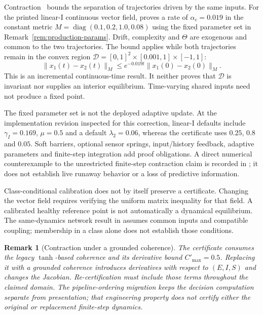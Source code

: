 \documentclass[11pt,twocolumn]{article}
\newtheorem{remark}[theorem]{Remark}
\begin{document}
Contraction~\cite{lohmiller1998contraction} bounds the separation
of trajectories driven by the same inputs. For the printed
linear-I continuous vector field, 
proves a rate of $\alpha_c=0.019$ in the constant metric
$M=\operatorname{diag}(0.1,0.2,1.0,0.08)$ using the fixed
parameter set in Remark~\ref{rem:production-params}. Drift,
complexity and $\Theta$ are exogenous and common to the two
trajectories. The bound applies while both trajectories remain
in the convex region
$\mathcal D=[0,1]^2\times[0.001,1]\times[-1,1]$:
\begin{equation}
 \|x_1(t)-x_2(t)\|_M
 \le e^{-0.019t}\|x_1(0)-x_2(0)\|_M.
 \label{eq:continuous-distance-bound}
\end{equation}
This is an incremental continuous-time result. It neither proves
that $\mathcal D$ is invariant nor supplies an interior equilibrium.
Time-varying shared inputs need not produce a fixed point.

The fixed parameter set is not the deployed adaptive update.
At the implementation revision inspected for this correction,
linear-I defaults include $\gamma_I=0.169$, $\mu=0.5$ and a default
$\lambda_2=0.06$, whereas the certificate uses $0.25$, $0.8$
and $0.05$. Soft barriers, optional sensor springs, input/history
feedback, adaptive parameters and finite-step integration add
proof obligations. A direct numerical counterexample to the
unrestricted finite-step contraction claim is recorded in
; it does not establish live runaway
behavior or a loss of predictive information.

Class-conditional calibration does not by itself preserve a
certificate. Changing the vector field requires verifying the
uniform matrix inequality for that field. A calibrated healthy
reference point is not automatically a dynamical equilibrium.
The same-dynamics network result in  assumes
common inputs and compatible coupling; membership in a class
alone does not establish those conditions.

\begin{remark}[Contraction under a grounded coherence]
\label{rem:phase3-contraction}
The certificate consumes the legacy $\tanh$-based coherence and
its derivative bound $C'_{\max}=0.5$. Replacing it with a grounded
coherence introduces derivatives with respect to $(E,I,S)$ and
changes the Jacobian. Re-certification must include those terms
throughout the claimed domain. The pipeline-ordering migration
keeps the decision computation separate from presentation; that
engineering property does not certify either the original or
replacement finite-step dynamics.
\end{remark}
\end{document}
